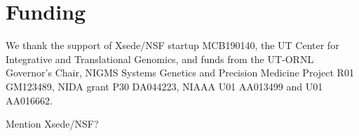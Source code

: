 \documentclass{bioinfo}
\begin{document}
\vspace*{-5mm}
\section*{Funding}

We thank the support of Xsede/NSF startup MCB190140, the UT Center for
Integrative and Translational Genomics, and funds from the UT-ORNL
Governor's Chair, NIGMS Systems Genetics and Precision Medicine
Project R01 GM123489, NIDA grant P30 DA044223, NIAAA U01 AA013499 and
U01 AA016662.

Mention Xsede/NSF?

\vspace*{-5mm}


\end{document}
